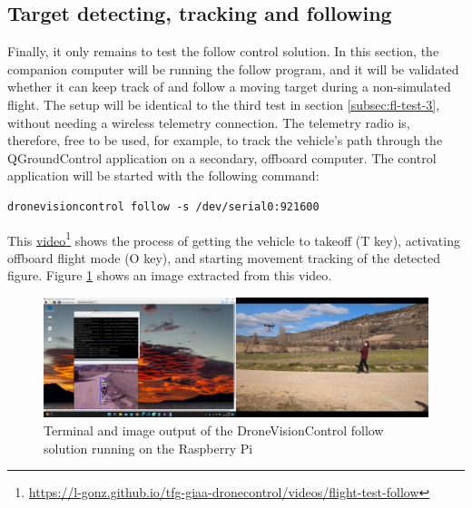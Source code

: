 \subsection{Target detecting, tracking and following}
\label{subsec:fl-test-5}


Finally, it only remains to test the follow control solution.
In this section, the companion computer will be running the follow program, and it will be validated whether it can keep track of and follow a moving target during a non-simulated flight.
The setup will be identical to the third test in section \ref{subsec:fl-test-3}, without needing a wireless telemetry connection.
The telemetry radio is, therefore, free to be used, for example, to track the vehicle's path through the QGroundControl application on a secondary, offboard computer.
The control application will be started with the following command:
\begin{verbatim}
dronevisioncontrol follow -s /dev/serial0:921600
\end{verbatim}
This \href{https://l-gonz.github.io/tfg-giaa-dronecontrol/videos/flight-test-follow}{video}\footnote{\url{https://l-gonz.github.io/tfg-giaa-dronecontrol/videos/flight-test-follow}} shows the process of getting the vehicle to takeoff (T key), activating offboard flight mode (O key), and starting movement tracking of the detected figure.
Figure \ref{fig:flight-test-follow} shows an image extracted from this video.


\begin{figure}
  \centering
  \includegraphics[width=\textwidth, keepaspectratio]{img/video-field-test-follow.png}
  \caption{Terminal and image output of the DroneVisionControl follow solution running on the Raspberry Pi}
  \label{fig:flight-test-follow}
\end{figure}

